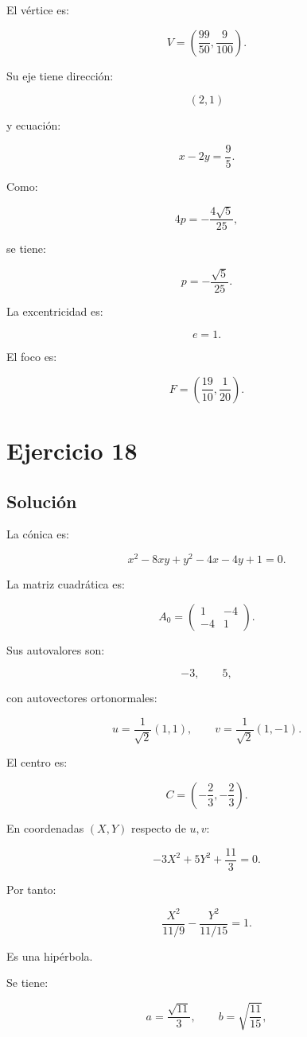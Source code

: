 \documentclass[11pt,a4paper]{article}
\begin{document}
El vértice es:

\[
\boxed{
V=
\left(
\frac{99}{50},
\frac9{100}
\right).
}
\]

Su eje tiene dirección:

\[
(2,1)
\]

y ecuación:

\[
\boxed{
x-2y=\frac95.
}
\]

Como:

\[
4p=-\frac{4\sqrt5}{25},
\]

se tiene:

\[
p=-\frac{\sqrt5}{25}.
\]

La excentricidad es:

\[
\boxed{e=1.}
\]

El foco es:

\[
\boxed{
F=
\left(
\frac{19}{10},
\frac1{20}
\right).
}
\]

\section{Ejercicio 18}
\subsection{Solución}

La cónica es:

\[
x^2-8xy+y^2-4x-4y+1=0.
\]

La matriz cuadrática es:

\[
A_0=
\begin{pmatrix}
1&-4\\
-4&1
\end{pmatrix}.
\]

Sus autovalores son:

\[
-3,
\qquad
5,
\]

con autovectores ortonormales:

\[
u=
\frac1{\sqrt2}(1,1),
\qquad
v=
\frac1{\sqrt2}(1,-1).
\]

El centro es:

\[
\boxed{
C=
\left(
-\frac23,-\frac23
\right).
}
\]

En coordenadas \((X,Y)\) respecto de \(u,v\):

\[
-3X^2+5Y^2+\frac{11}{3}=0.
\]

Por tanto:

\[
\boxed{
\frac{X^2}{11/9}
-
\frac{Y^2}{11/15}
=
1.
}
\]

Es una hipérbola.

Se tiene:

\[
a=\frac{\sqrt{11}}{3},
\qquad
b=\sqrt{\frac{11}{15}},
\]
\end{document}
